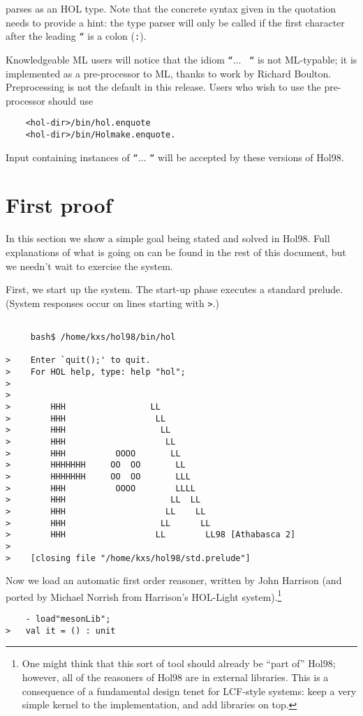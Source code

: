 \noindent parses as an HOL type. Note that the concrete syntax given in
the quotation needs to provide a hint: the type parser will only be
called if the first character after the leading {\tt ``} is a colon (\verb+:+).

Knowledgeable ML users will notice that the idiom {\tt ``}$\ldots$ {\tt
``} is not ML-typable; it is implemented as a pre-processor to ML,
thanks to work by Richard Boulton. Preprocessing is not the default in
this release. Users who wish to use the pre-processor should use

\begin{verbatim}
    <hol-dir>/bin/hol.enquote
    <hol-dir>/bin/Holmake.enquote.
\end{verbatim}

Input containing instances of {\tt ``}$\ldots$ {\tt ``} will be accepted
by these versions of Hol98. 

\section{First proof}

In this section we show a simple goal being stated and solved in
Hol98. Full explanations of what is going on can be found in the rest of
this document, but we needn't wait to exercise the system.

First, we start up the system. The start-up phase executes a standard
prelude. (System responses occur on lines starting with \verb+>+.)

\begin{verbatim}

     bash$ /home/kxs/hol98/bin/hol

>    Enter `quit();' to quit.
>    For HOL help, type: help "hol";
> 
> 
>        HHH                 LL
>        HHH                  LL
>        HHH                   LL
>        HHH                    LL
>        HHH          OOOO       LL
>        HHHHHHH     OO  OO       LL
>        HHHHHHH     OO  OO       LLL
>        HHH          OOOO        LLLL
>        HHH                     LL  LL
>        HHH                    LL    LL
>        HHH                   LL      LL
>        HHH                  LL        LL98 [Athabasca 2]
>
>    [closing file "/home/kxs/hol98/std.prelude"]

\end{verbatim}

 Now we load an automatic first order reasoner, written by John Harrison
(and ported by Michael Norrish from Harrison's HOL-Light
system).\footnote{One might think that this sort of tool should already
be ``part of'' Hol98; however, all of the reasoners of Hol98 are in
external libraries. This is a consequence of a fundamental design tenet
for LCF-style systems: keep a very simple kernel to the implementation,
and add libraries on top.} 
\begin{verbatim}
    - load"mesonLib";
>   val it = () : unit
\end{verbatim}

